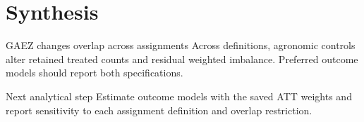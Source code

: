 \documentclass[aspectratio=169]{beamer}
\begin{document}
\section{Synthesis}
\begin{frame}{\hspace{1.5em}GAEZ changes overlap across assignments}
\small Across definitions, agronomic controls alter retained treated counts and residual weighted imbalance. Preferred outcome models should report both specifications.
\vspace{0.7em}
\centering\scriptsize
{}
\vspace{1em}
\begin{block}{Next analytical step}
Estimate outcome models with the saved ATT weights and report sensitivity to each assignment definition and overlap restriction.
\end{block}
\end{frame}
\end{document}
